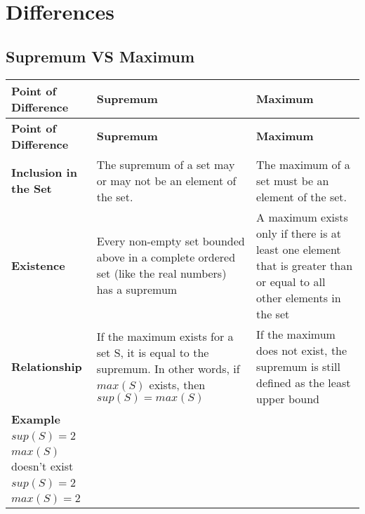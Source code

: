 \chapter{Differences}

\section{Supremum VS Maximum \cite{chatgpt}}\label{Supremum VS Maximum}

\begin{longtable}{|p{3cm}|p{6cm}|p{6cm}|}
    \hline
    \textbf{Point of Difference} & \textbf{Supremum} & \textbf{Maximum}\\ \hline
    \endfirsthead

    \hline
    \textbf{Point of Difference} & \textbf{Supremum} & \textbf{Maximum}\\ \hline
    \endhead

    \hline\endfoot
    \hline\endlastfoot

    \textbf{Inclusion in the Set} & The supremum of a set may or may not be an element of the set. & The maximum of a set must be an element of the set. \\
    \hline
    
    \textbf{Existence} & Every non-empty set bounded above in a complete ordered set (like the real numbers) has a supremum & A maximum exists only if there is at least one element that is greater than or equal to all other elements in the set\\
    \hline

    \textbf{Relationship} & If the maximum exists for a set S, it is equal to the supremum. In other words, if $max(S)$ exists, then $sup(S) = max(S)$ & If the maximum does not exist, the supremum is still defined as the least upper bound\\
    \hline

    \textbf{Example} & 
    \begin{minipage}{5cm}
        \vspace{0.1cm}
        $S = \{x \in R | x < 2\}$ \\
        $sup(S) = 2$\\
        $max(S)$ doesn’t exist
        \vspace{0.1cm}
    \end{minipage} &
    \begin{minipage}{5cm}
        \vspace{0.1cm}
        $S = \{x \in R | x \leq 2\}$ \\
        $sup(S) = 2$\\
        $max(S) = 2$
        \vspace{0.1cm}
    \end{minipage} \\
    \hline
\end{longtable}


